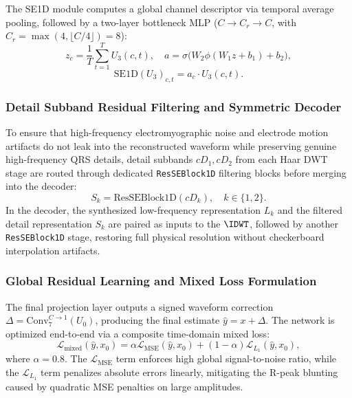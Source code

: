 The SE1D module computes a global channel descriptor via temporal average pooling, followed by a two-layer bottleneck MLP ($C \to C_r \to C$, with $C_r = \max(4, \lfloor C/4 \rfloor) = 8$):
\begin{equation}
z_c = \frac{1}{T}\sum_{t=1}^T U_{3}(c, t), \quad a = \sigma\big(W_2 \phi(W_1 z + b_1) + b_2\big),
\end{equation}
\begin{equation}
\mathrm{SE1D}(U_3)_{c,t} = a_c \cdot U_{3}(c, t).
\end{equation}

\subsubsection{Detail Subband Residual Filtering and Symmetric Decoder}
To ensure that high-frequency electromyographic noise and electrode motion artifacts do not leak into the reconstructed waveform while preserving genuine high-frequency QRS details, detail subbands $cD_1, cD_2$ from each Haar DWT stage are routed through dedicated \texttt{ResSEBlock1D} filtering blocks before merging into the decoder:
\begin{equation}
S_k = \mathrm{ResSEBlock1D}(cD_k), \quad k \in \{1, 2\}.
\end{equation}
In the decoder, the synthesized low-frequency representation $L_k$ and the filtered detail representation $S_k$ are paired as inputs to the $\IDWT$, followed by another \texttt{ResSEBlock1D} stage, restoring full physical resolution without checkerboard interpolation artifacts.

\subsubsection{Global Residual Learning and Mixed Loss Formulation}
The final projection layer outputs a signed waveform correction $\Delta = \mathrm{Conv}^{C \to 1}_7(U_0)$, producing the final estimate $\hat{y} = x + \Delta$. The network is optimized end-to-end via a composite time-domain mixed loss:
\begin{equation}
\mathcal{L}_{\mathrm{mixed}}(\hat{y}, x_0) = \alpha \mathcal{L}_{\mathrm{MSE}}(\hat{y}, x_0) + (1-\alpha) \mathcal{L}_{L_1}(\hat{y}, x_0),
\label{eq:mixed_loss}
\end{equation}
where $\alpha = 0.8$. The $\mathcal{L}_{\mathrm{MSE}}$ term enforces high global signal-to-noise ratio, while the $\mathcal{L}_{L_1}$ term penalizes absolute errors linearly, mitigating the R-peak blunting caused by quadratic MSE penalties on large amplitudes.

